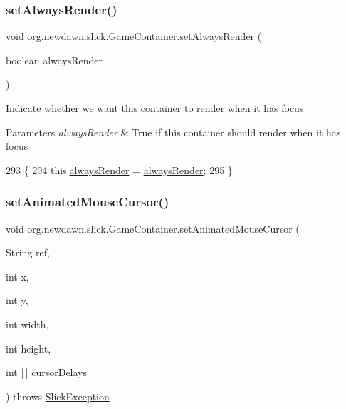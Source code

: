 \subsubsection{\texorpdfstring{set\+Always\+Render()}{setAlwaysRender()}}
{\footnotesize\ttfamily void org.\+newdawn.\+slick.\+Game\+Container.\+set\+Always\+Render (\begin{DoxyParamCaption}\item[{boolean}]{always\+Render }\end{DoxyParamCaption})\hspace{0.3cm}{\ttfamily [inline]}}

Indicate whether we want this container to render when it has focus


\begin{DoxyParams}{Parameters}
{\em always\+Render} & True if this container should render when it has focus \\
\hline
\end{DoxyParams}

\begin{DoxyCode}
293                                                        \{
294         this.\mbox{\hyperlink{classorg_1_1newdawn_1_1slick_1_1_game_container_afc21372962046ca458a65fbd22fe4905}{alwaysRender}} = \mbox{\hyperlink{classorg_1_1newdawn_1_1slick_1_1_game_container_afc21372962046ca458a65fbd22fe4905}{alwaysRender}};
295     \}
\end{DoxyCode}
\mbox{\label{classorg_1_1newdawn_1_1slick_1_1_game_container_a03f4fc9e7bf9d2d8ad048b95762a36d4}} 
\subsubsection{\texorpdfstring{set\+Animated\+Mouse\+Cursor()}{setAnimatedMouseCursor()}}
{\footnotesize\ttfamily void org.\+newdawn.\+slick.\+Game\+Container.\+set\+Animated\+Mouse\+Cursor (\begin{DoxyParamCaption}\item[{String}]{ref,  }\item[{int}]{x,  }\item[{int}]{y,  }\item[{int}]{width,  }\item[{int}]{height,  }\item[{int \mbox{[}$\,$\mbox{]}}]{cursor\+Delays }\end{DoxyParamCaption}) throws \mbox{\hyperlink{classorg_1_1newdawn_1_1slick_1_1_slick_exception}{Slick\+Exception}}\hspace{0.3cm}{\ttfamily [inline]}}

